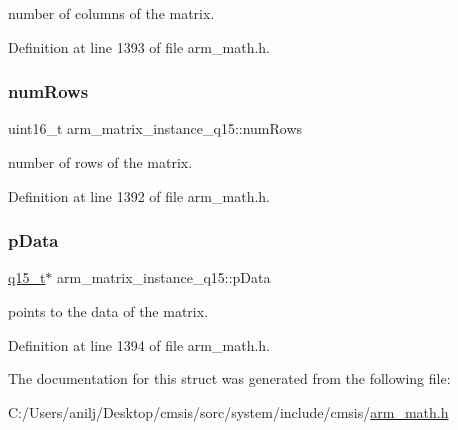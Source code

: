 number of columns of the matrix. 

Definition at line 1393 of file arm\+\_\+math.\+h.

\mbox{\label{structarm__matrix__instance__q15_a9bac6ed54be287c4d4f01a1a28be65f5}} 
\subsubsection{\texorpdfstring{num\+Rows}{numRows}}
{\footnotesize\ttfamily uint16\+\_\+t arm\+\_\+matrix\+\_\+instance\+\_\+q15\+::num\+Rows}

number of rows of the matrix. 

Definition at line 1392 of file arm\+\_\+math.\+h.

\mbox{\label{structarm__matrix__instance__q15_a6da33a5553e634787d0f515cf8d724af}} 
\subsubsection{\texorpdfstring{p\+Data}{pData}}
{\footnotesize\ttfamily \hyperlink{arm__math_8h_ab5a8fb21a5b3b983d5f54f31614052ea}{q15\+\_\+t}$\ast$ arm\+\_\+matrix\+\_\+instance\+\_\+q15\+::p\+Data}

points to the data of the matrix. 

Definition at line 1394 of file arm\+\_\+math.\+h.



The documentation for this struct was generated from the following file\+:\begin{DoxyCompactItemize}
\item 
C\+:/\+Users/anilj/\+Desktop/cmsis/sorc/system/include/cmsis/\hyperlink{arm__math_8h}{arm\+\_\+math.\+h}\end{DoxyCompactItemize}

